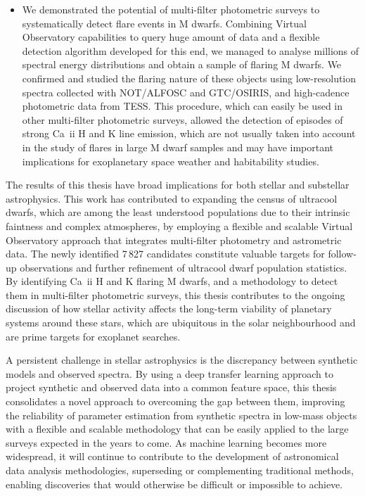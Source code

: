 \begin{itemize}
    \item We demonstrated the potential of multi-filter photometric surveys to systematically detect flare events in M dwarfs. Combining Virtual Observatory capabilities to query huge amount of data and a flexible detection algorithm developed for this end, we managed to analyse millions of spectral energy distributions and obtain a sample of flaring M dwarfs. We confirmed and studied the flaring nature of these objects using low-resolution spectra collected with NOT/ALFOSC and GTC/OSIRIS, and high-cadence photometric data from TESS. This procedure, which can easily be used in other multi-filter photometric surveys, allowed the detection of episodes of strong Ca~{\sc ii} H and K line emission, which are not usually taken into account in the study of flares in large M dwarf samples and may have important implications for exoplanetary space weather and habitability studies.

\end{itemize}


The results of this thesis have broad implications for both stellar and substellar astrophysics. This work has contributed to expanding the census of ultracool dwarfs, which are among the least understood populations due to their intrinsic faintness and complex atmospheres, by employing a flexible and scalable Virtual Observatory approach that integrates multi-filter photometry and astrometric data. The newly identified 7\,827 candidates constitute valuable targets for follow-up observations and further refinement of ultracool dwarf population statistics. By identifying Ca~{\sc ii} H and K flaring M dwarfs, and a methodology to detect them in multi-filter photometric surveys, this thesis contributes to the ongoing discussion of how stellar activity affects the long-term viability of planetary systems around these stars, which are ubiquitous in the solar neighbourhood and are prime targets for exoplanet searches.

A persistent challenge in stellar astrophysics is the discrepancy between synthetic models and observed spectra. By using a deep transfer learning approach to project synthetic and observed data into a common feature space, this thesis consolidates a novel approach to overcoming the gap between them, improving the reliability of parameter estimation from synthetic spectra in low-mass objects with a flexible and scalable methodology that can be easily applied to the large surveys expected in the years to come. As machine learning becomes more widespread, it will continue to contribute to the development of astronomical data analysis methodologies, superseding or complementing traditional methods, enabling discoveries that would otherwise be difficult or impossible to achieve.

